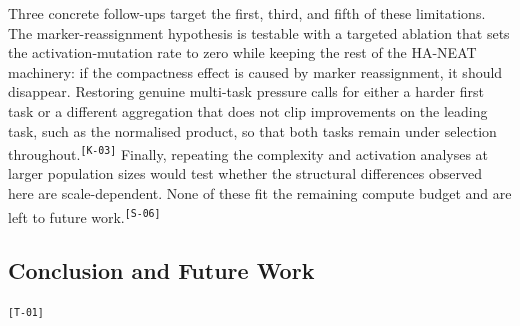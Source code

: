 \documentclass[12pt]{article}
\newcommand{\revID}[1]{\textsuperscript{\scriptsize\texttt{[#1]}}}
\newcommand{\revStyle}[2]{\textcolor{revViolet}{#2}\revID{#1}}
\newcommand{\revConsistency}[2]{\textcolor{revBlue}{#2}\revID{#1}}
\newcommand{\revStructure}[2]{\textcolor{revAmber}{#2}\revID{#1}}
\begin{document}
Three concrete follow-ups target the first, third, and fifth of these limitations.
The marker-reassignment hypothesis is testable with a targeted ablation that sets the activation-mutation rate to zero while keeping the rest of the HA-NEAT machinery: if the compactness effect is caused by marker reassignment, it should disappear.
\revConsistency{K-03}{Restoring genuine multi-task pressure calls for either a harder first task or a different aggregation that does not clip improvements on the leading task, such as the normalised product, so that both tasks remain under selection throughout.}
Finally, repeating the complexity and activation analyses at larger population sizes would test whether the structural differences observed here are scale-dependent.
\revStyle{S-06}{None of these fit the remaining compute budget and are left to future work.}




\revStructure{T-01}{\section{Conclusion and Future Work}}
\label{sec:conclusion-and-future-work}


\clearpage \printbibliography
\end{document}
